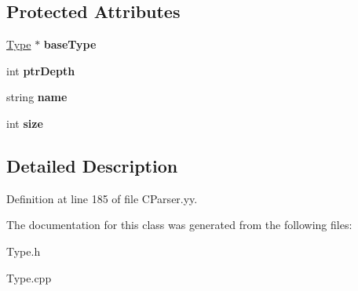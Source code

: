 \subsection*{Protected Attributes}
\begin{DoxyCompactItemize}
\item 
\hypertarget{classPointerType_a6b90a7eaa7d7887f2e3351c508c618af}{\hyperlink{classType}{Type} $\ast$ {\bfseries base\-Type}}\label{classPointerType_a6b90a7eaa7d7887f2e3351c508c618af}

\item 
\hypertarget{classPointerType_acae06a11545eafb06ea7cfba23529baa}{int {\bfseries ptr\-Depth}}\label{classPointerType_acae06a11545eafb06ea7cfba23529baa}

\item 
\hypertarget{classType_ad7eeefba3dfcecbdaa98d46aaa84e389}{string {\bfseries name}}\label{classType_ad7eeefba3dfcecbdaa98d46aaa84e389}

\item 
\hypertarget{classType_a871302dc63ac1a37c0b6a225cf82048d}{int {\bfseries size}}\label{classType_a871302dc63ac1a37c0b6a225cf82048d}

\end{DoxyCompactItemize}


\subsection{Detailed Description}


Definition at line 185 of file C\-Parser.\-yy.



The documentation for this class was generated from the following files\-:\begin{DoxyCompactItemize}
\item 
Type.\-h\item 
Type.\-cpp\end{DoxyCompactItemize}
